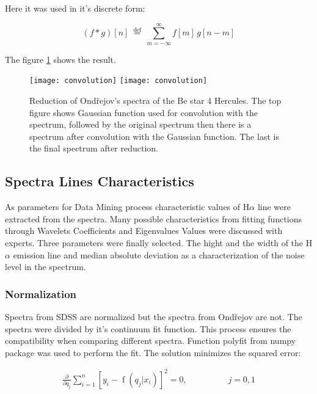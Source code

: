 Here it was used in it's discrete form:

\begin{equation}
  \label{eq:discreteConvolution}
  (f * g)[n]\ \stackrel{\mathrm{def}}{=}\ \sum_{m=-\infty}^{\infty} f[m]\, g[n - m]
\end{equation}


The figure \ref{FigReduction} shows the result.

    \begin{figure}[!htbp]
      \begin{center}
        \leavevmode
        \ifpdf
        \texttt{[image: convolution]}
        \else
        \texttt{[image: convolution]}
        \fi
        \caption{Reduction of Ondřejov's spectra of the Be star 4
          Hercules. The top figure shows Gaussian function used for
          convolution with the spectrum, followed by the original
          spectrum then there is a spectrum after convolution with the
          Gaussian function. The last is the final spectrum after
          reduction.}
        \label{FigReduction}
      \end{center}
    \end{figure}





\subsection{Spectra Lines Characteristics}
As parameters for Data Mining process characteristic values of
H$\alpha$ line were extracted from the spectra. Many possible
characteristics from fitting functions through Wavelets Coefficients
and Eigenvalues Values were discussed with experts. Three parameters
were finally selected. The hight and the width of the H$\alpha$
emission line and median absolute deviation as a characterization of
the noise level in the spectrum.


\subsubsection{Normalization}
Spectra from SDSS are normalized but the spectra from Ondřejov are
not. The spectra were divided by it's continuum fit function. This
process ensures the compatibility when comparing different
spectra. Function polyfit from numpy package was used to perform the
fit. The solution minimizes the squared error:

\begin{align}
  \frac{\partial}{\partial q_j} \sum_{i = 1}^n{[y_i -
    \operatorname{f}(q_j|x_i) ]^2} = 0,\hspace{2cm} j = 0,1
\end{align}


